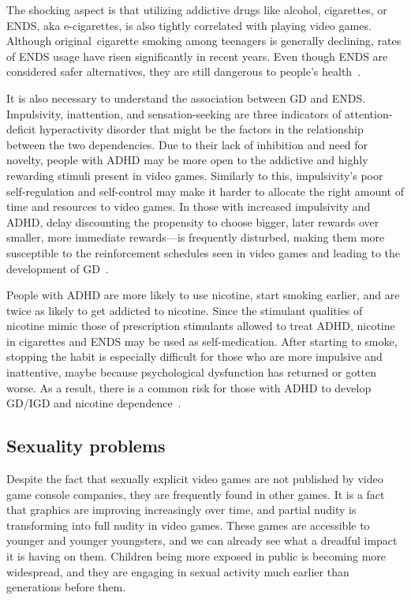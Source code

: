 \documentclass[10pt,twoside,english,a4paper]{article}
\begin{document}
The shocking aspect is that utilizing addictive drugs like alcohol, cigarettes, or ENDS, aka e-cigarettes, is also tightly correlated with playing video games. Although original cigarette smoking among teenagers is generally declining, rates of ENDS usage have risen significantly in recent years. Even though ENDS are considered safer alternatives, they are still dangerous to people's health~\cite{disorder}.

It is also necessary to understand the association between GD and ENDS. Impulsivity, inattention, and sensation-seeking are three indicators of attention-deficit hyperactivity disorder that might be the factors in the relationship between the two dependencies. Due to their lack of inhibition and need for novelty, people with ADHD may be more open to the addictive and highly rewarding stimuli present in video games. Similarly to this, impulsivity's poor self-regulation and self-control may make it harder to allocate the right amount of time and resources to video games. In those with increased impulsivity and ADHD, delay discounting the propensity to choose bigger, later rewards over smaller, more immediate rewards—is frequently disturbed, making them more susceptible to the reinforcement schedules seen in video games and leading to the development of GD~\cite{disorder}.

People with ADHD are more likely to use nicotine, start smoking earlier, and are twice as likely to get addicted to nicotine. Since the stimulant qualities of nicotine mimic those of prescription stimulants allowed to treat ADHD, nicotine in cigarettes and ENDS may be used as self-medication. After starting to smoke, stopping the habit is especially difficult for those who are more impulsive and inattentive, maybe because psychological dysfunction has returned or gotten worse. As a result, there is a common risk for those with ADHD to develop GD/IGD and nicotine dependence~\cite{disorder}.

\subsection{Sexuality problems}
Despite the fact that sexually explicit video games are not published by video game console companies, they are frequently found in other games. It is a fact that graphics are improving increasingly over time, and partial nudity is transforming into full nudity in video games. These games are accessible to younger and younger youngsters, and we can already see what a dreadful impact it is having on them. Children being more exposed in public is becoming more widespread, and they are engaging in sexual activity much earlier than generations before them.
\end{document}
